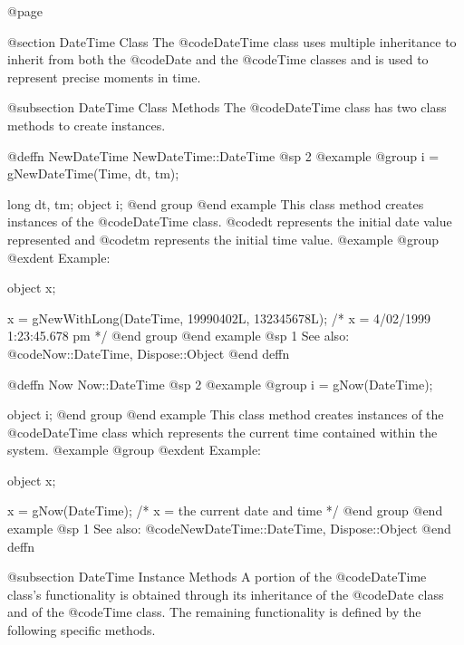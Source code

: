@page

@section DateTime Class
The @code{DateTime} class uses multiple inheritance to inherit
from both the @code{Date} and the @code{Time} classes and is
used to represent precise moments in time.





@subsection DateTime Class Methods
The @code{DateTime} class has two class methods to create instances.






@deffn {NewDateTime} NewDateTime::DateTime
@sp 2
@example
@group
i = gNewDateTime(Time, dt, tm);

long    dt, tm;
object  i;
@end group
@end example
This class method creates instances of the @code{DateTime} class.  @code{dt}
represents the initial date value represented and @code{tm} represents
the initial time value.
@example
@group
@exdent Example:

object  x;

x = gNewWithLong(DateTime, 19990402L, 132345678L);
/*  x = 4/02/1999 1:23:45.678 pm  */
@end group
@end example
@sp 1
See also:  @code{Now::DateTime, Dispose::Object}
@end deffn










@deffn {Now} Now::DateTime
@sp 2
@example
@group
i = gNow(DateTime);

object  i;
@end group
@end example
This class method creates instances of the @code{DateTime} class which
represents the current time contained within the system.
@example
@group
@exdent Example:

object  x;

x = gNow(DateTime);   /*  x = the current date and time  */
@end group
@end example
@sp 1
See also:  @code{NewDateTime::DateTime, Dispose::Object}
@end deffn










@subsection DateTime Instance Methods
A portion of the @code{DateTime} class's functionality is obtained through
its inheritance of the @code{Date} class and of the @code{Time} class.  The
remaining functionality is defined by the following specific methods.







